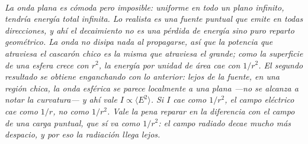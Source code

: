 \begin{center}
\\[0.5em]
{\small\itshape La onda plana es cómoda pero imposible: uniforme en todo un
plano infinito, tendría energía total infinita. Lo realista es una fuente
puntual que emite en todas direcciones, y ahí el decaimiento no es una pérdida
de energía sino puro reparto geométrico. La onda no disipa nada al propagarse,
así que la potencia que atraviesa el cascarón chico es la misma que atraviesa el
grande; como la superficie de una esfera crece con $r^2$, la energía por unidad
de área cae con $1/r^2$. El segundo resultado se obtiene enganchando con lo
anterior: lejos de la fuente, en una región chica, la onda esférica se parece
localmente a una plana ---no se alcanza a notar la curvatura--- y ahí vale
$I \propto \langle E^2\rangle$. Si $I$ cae como $1/r^2$, el campo eléctrico cae
como $1/r$, no como $1/r^2$. Vale la pena reparar en la diferencia con el campo
de una carga puntual, que sí va como $1/r^2$: el campo \emph{radiado} decae
mucho más despacio, y por eso la radiación llega lejos.}
\end{center}
